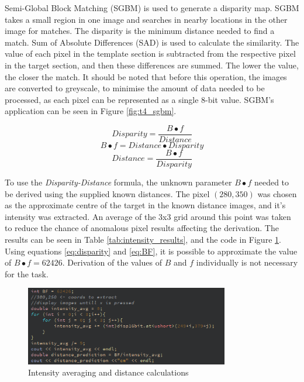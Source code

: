 \documentclass[conference]{IEEEtran}
\begin{document}
Semi-Global Block Matching (SGBM) is used to generate a disparity map. SGBM takes a small region in one image and searches in nearby locations in the other image for matches. The disparity is the minimum distance needed to find a match. Sum of Absolute Differences (SAD) is used to calculate the similarity\cite{StereoBlockMatching}. The value of each pixel in the template section is subtracted from the respective pixel in the target section, and then these differences are summed. The lower the value, the closer the match. It should be noted that before this operation, the images are converted to greyscale, to minimise the amount of data needed to be processed, as each pixel can be represented as a single 8-bit value. SGBM's application can be seen in Figure \ref{fig:t4_sgbm}.

\begin{equation} \label{eq:disparity}
Disparity = \frac{B \bullet f}{Distance}
\end{equation}
\begin{equation} \label{eq:BF}
B \bullet f = Distance \bullet Disparity
\end{equation}
\begin{equation}	\label{eq:Distance}
Distance = \frac{B\bullet f}{Disparity}
\end{equation}

To use the \textit{Disparity-Distance} formula, the unknown parameter $B \bullet f$ needed to be derived using the supplied known distances. The pixel $(280,350)$ was chosen as the approximate centre of the target in the known distance images, and it's intensity was extracted. An average of the 3x3 grid around this point was taken to reduce the chance of anomalous pixel results affecting the derivation. The results can be seen in Table \ref{tab:intensity_results}, and the code in Figure \ref{fig:t4_intensity}. Using equations \ref{eq:disparity} and \ref{eq:BF}, it is possible to approximate the value of $B \bullet f = 62426$. Derivation of the values of $B$ and $f$ individually is not necessary for the task. 

\begin{figure}[H]
\centering
\includegraphics[width=3.5in]{t4_intensity}
\caption{Intensity averaging and distance calculations}
\label{fig:t4_intensity}
\end{figure}
\end{document}
